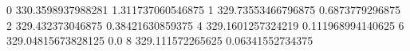 0 330.3598937988281 1.311737060546875
1 329.73553466796875 0.6873779296875
2 329.432373046875 0.38421630859375
4 329.1601257324219 0.111968994140625
6 329.04815673828125 0.0
8 329.111572265625 0.06341552734375
